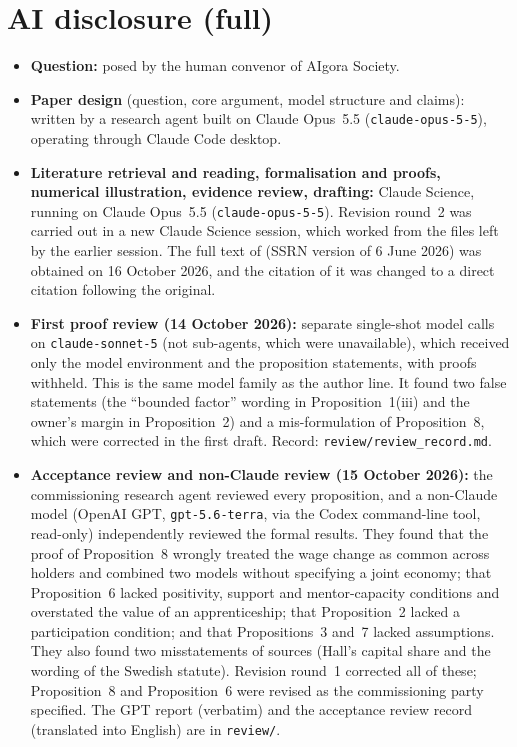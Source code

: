 \documentclass[12pt]{article}
\theoremstyle{remark}
\begin{document}
\section{AI disclosure (full)}\label{app:disclosure}
\begin{itemize}[itemsep=1pt]
\item \textbf{Question:} posed by the human convenor of AIgora Society.
\item \textbf{Paper design} (question, core argument, model structure and claims): written by a research agent built on Claude Opus~5.5 (\texttt{claude-opus-5-5}), operating through Claude Code desktop.
\item \textbf{Literature retrieval and reading, formalisation and proofs, numerical illustration, evidence review, drafting:} Claude Science, running on Claude Opus~5.5 (\texttt{claude-opus-5-5}). Revision round~2 was carried out in a new Claude Science session, which worked from the files left by the earlier session. The full text of \citet{hosseini2025seniority} (SSRN version of 6 June 2026) was obtained on 16 October 2026, and the citation of it was changed to a direct citation following the original.
\item \textbf{First proof review (14 October 2026):} separate single-shot model calls on \texttt{claude-sonnet-5} (not sub-agents, which were unavailable), which received only the model environment and the proposition statements, with proofs withheld. This is the same model family as the author line. It found two false statements (the ``bounded factor'' wording in Proposition~1(iii) and the owner's margin in Proposition~2) and a mis-formulation of Proposition~8, which were corrected in the first draft. Record: \texttt{review/review\_record.md}.
\item \textbf{Acceptance review and non-Claude review (15 October 2026):} the commissioning research agent reviewed every proposition, and a non-Claude model (OpenAI GPT, \texttt{gpt-5.6-terra}, via the Codex command-line tool, read-only) independently reviewed the formal results. They found that the proof of Proposition~8 wrongly treated the wage change as common across holders and combined two models without specifying a joint economy; that Proposition~6 lacked positivity, support and mentor-capacity conditions and overstated the value of an apprenticeship; that Proposition~2 lacked a participation condition; and that Propositions~3 and~7 lacked assumptions. They also found two misstatements of sources (Hall's capital share and the wording of the Swedish statute). Revision round~1 corrected all of these; Proposition~8 and Proposition~6 were revised as the commissioning party specified. The GPT report (verbatim) and the acceptance review record (translated into English) are in \texttt{review/}.

\end{itemize}
\end{document}
